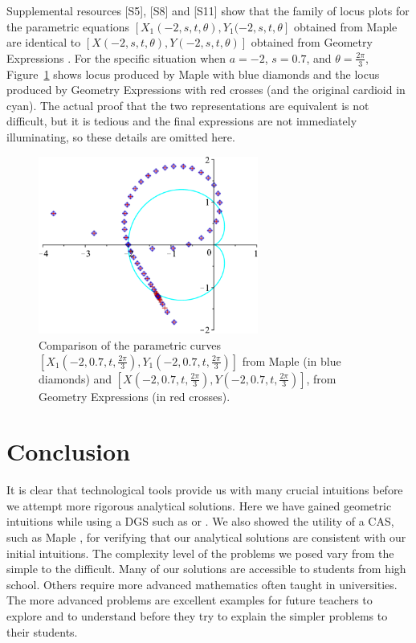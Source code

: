 \documentclass[12pt,a4paper]{article}%
\begin{document}
Supplemental resources [S5], [S8] and [S11] show that the family of locus plots
for the parametric equations $[X_{1}(-2,s,t,\theta),Y_{1}(-2,s,t,\theta]$
obtained from Maple \cite{Maple} are identical to $[X(-2,s,t,\theta),Y(-2,s,t,\theta)]$
obtained from Geometry Expressions \cite{GE}.
For the specific situation when $a=-2$, $s=0.7$, and $\theta=\frac{2\pi}{3}$,
Figure~\ref{fig15} shows locus produced by Maple with blue diamonds and
the locus produced by Geometry Expressions with red crosses (and the
original cardioid in cyan). The actual proof that the two representations are
equivalent is not difficult, but it is tedious and the final expressions are not
immediately illuminating, so these details are omitted here.
 
\begin{figure}[htpb]
\begin{center}
 \includegraphics[height=2.3in,keepaspectratio]{PJH75I1Z-crop.pdf}
\end{center}
\caption{Comparison of the parametric curves
              $\left[X_1\left(-2,0.7,t,\frac{2\pi}{3}\right), Y_1\left(-2,0.7,t,\frac{2\pi}{3}\right)\right]$
               from Maple (in blue diamonds) and 
              $\left[X\left(-2,0.7,t,\frac{2\pi}{3}\right), Y\left(-2,0.7,t,\frac{2\pi}{3}\right)\right]$,
               from Geometry Expressions (in red crosses).}
\label{fig15}
\end{figure}

\section{Conclusion} \label{conc}

It is clear that technological tools provide us with many crucial intuitions
before we attempt more rigorous analytical solutions. Here we have gained
geometric intuitions while using a DGS such as \cite{CP} or \cite{GE}.
We also showed the utility of a CAS, such as Maple \cite{Maple}, for verifying that our
analytical solutions are consistent with our initial intuitions. The
complexity level of the problems we posed vary from the simple to the
difficult. Many of our solutions are accessible to students from high school.
Others require more advanced mathematics often taught in universities.
The more advanced problems
are excellent examples for future teachers to explore and to understand before they
try to explain the simpler problems to their students.
\end{document}
